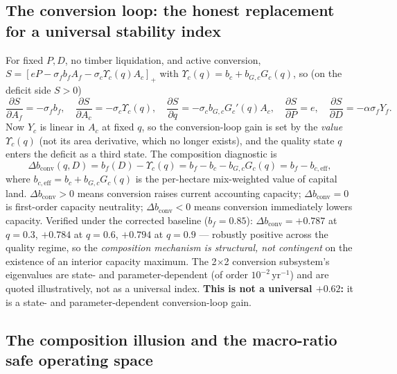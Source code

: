 \documentclass[11pt]{article}
\begin{document}
\subsection{The conversion loop: the honest replacement for a universal stability index}

For fixed $P,D$, no timber liquidation, and active conversion, $S=[eP-\sigma_fb_fA_f-\sigma_c\Upsilon_c(q)A_c]_+$ with $\Upsilon_c(q)=b_c+b_{G,c}G_c(q)$, so (on the deficit side $S>0$)
\[
\frac{\partial S}{\partial A_f}=-\sigma_fb_f,\quad
\frac{\partial S}{\partial A_c}=-\sigma_c\Upsilon_c(q),\quad
\frac{\partial S}{\partial q}=-\sigma_cb_{G,c}G_c'(q)A_c,\quad
\frac{\partial S}{\partial P}=e,\quad
\frac{\partial S}{\partial D}=-\alpha\sigma_fY_f.
\]
Now $Y_c$ is linear in $A_c$ at fixed $q$, so the conversion-loop gain is set by the \emph{value} $\Upsilon_c(q)$ (not its area derivative, which no longer exists), and the quality state $q$ enters the deficit as a third state. The composition diagnostic is
\[
\Delta b_{\mathrm{conv}}(q,D)=b_f(D)-\Upsilon_c(q)=b_f-b_c-b_{G,c}G_c(q)=b_f-b_{c,\mathrm{eff}},
\]
where $b_{c,\mathrm{eff}}=b_c+b_{G,c}G_c(q)$ is the per-hectare mix-weighted value of capital land. $\Delta b_{\mathrm{conv}}>0$ means conversion raises current accounting capacity; $\Delta b_{\mathrm{conv}}=0$ is first-order capacity neutrality; $\Delta b_{\mathrm{conv}}<0$ means conversion immediately lowers capacity. Verified under the corrected baseline ($b_f=0.85$): $\Delta b_{\mathrm{conv}}=+0.787$ at $q=0.3$, $+0.784$ at $q=0.6$, $+0.794$ at $q=0.9$ --- robustly positive across the quality regime, so the \emph{composition mechanism is structural, not contingent} on the existence of an interior capacity maximum. The 2$\times$2 conversion subsystem's eigenvalues are state- and parameter-dependent (of order $10^{-2}\,\text{yr}^{-1}$) and are quoted illustratively, not as a universal index. \textbf{This is not a universal $+0.62$:} it is a state- and parameter-dependent conversion-loop gain.

\subsection{The composition illusion and the macro-ratio safe operating space}
\end{document}
